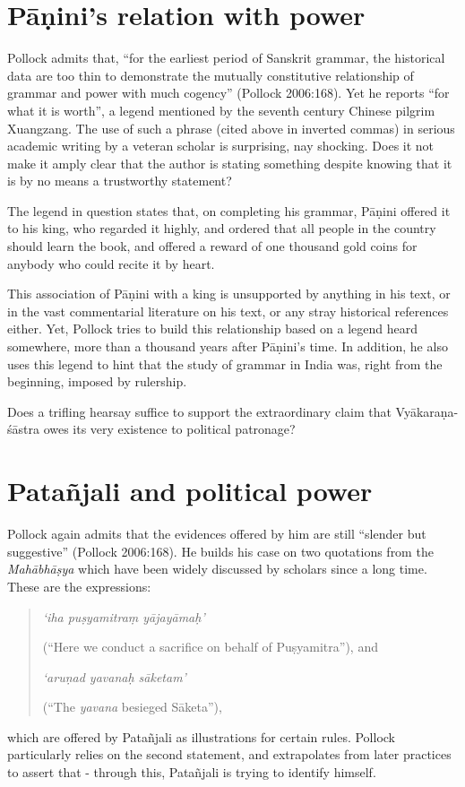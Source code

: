 \section{Pāṇini’s relation with power}\label{chap3-sec8}

Pollock admits that, ``for the earliest period of Sanskrit grammar, the historical data are too thin to demonstrate the mutually constitutive relationship of grammar and power with much cogency'' (Pollock 2006:168). Yet he reports ``for what it is worth'', a legend mentioned by the seventh century Chinese pilgrim Xuangzang. The use of such a phrase (cited above in inverted commas) in serious academic writing by a veteran scholar is surprising, nay shocking. Does it not make it amply clear that the author is stating something despite knowing that it is by no means a trustworthy statement? 

The legend in question states that, on completing his grammar, Pāṇini offered it to his king, who regarded it highly, and ordered that all people in the country should learn the book, and offered a reward of one thousand gold coins for anybody who could recite it by heart. 

This association of Pāṇini with a king is unsupported by anything in his text, or in the vast commentarial literature on his text, or any stray historical references either. Yet, Pollock tries to build this relationship based on a legend heard somewhere, more than a thousand years after Pāṇini's time. In addition, he also uses this legend to hint that the study of grammar in India was, right from the beginning, imposed by rulership. 

Does a trifling hearsay suffice to support the extraordinary claim that Vyākaraṇa-śāstra owes its very existence to political patronage?

\section{Patañjali and political power}\label{chap3-sec9}

Pollock again admits that the evidences offered by him are still ``slender but suggestive'' (Pollock 2006:168). He builds his case on two quotations from the {\sl Mahābhāṣya} which have been widely discussed by scholars since a long time. These are the expressions: 
\begin{quote}
{{\sl `iha puṣyamitraṃ yājayāmaḥ'}}

(``Here we conduct a sacrifice on behalf of Puṣyamitra''), and

{{\sl `aruṇad yavanaḥ sāketam'}}

(``The {\sl yavana} besieged Sāketa''),
\end{quote}
which are offered by Patañjali as illustrations for certain rules. Pollock particularly relies on the second statement, and extrapolates from later practices to assert that - through this, Patañjali is trying to identify himself.


